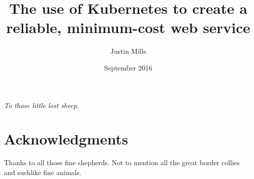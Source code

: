 \documentclass[thesis,proposal]{umassthesis}  %
\begin{document}
\title{The use of Kubernetes to create a\protect\\reliable, minimum-cost web service
  \protect\\}
\author{Justin Mills}
\date{September 2016} %





\frontmatter
\maketitle
\copyrightpage     %
\signaturepage

\begin{dedication}              %
  \begin{center}
    \emph{To those little lost sheep.} %
  \end{center}
\end{dedication}

\chapter{Acknowledgments}             %
  Thanks to all those fine shepherds. Not to mention all the great
  border collies and suchlike fine animals.
\end{document}
